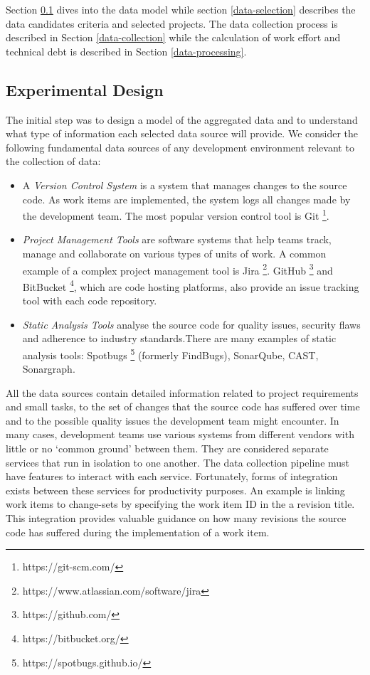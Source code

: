 \documentclass{mpaper}
\begin{document}
Section \ref{experimental-design} dives into the data model while section
\ref{data-selection} describes the data candidates criteria and selected
projects. The data collection process is described in Section
\ref{data-collection} while the calculation of work effort and technical debt is
described in Section \ref{data-processing}.

\subsection{Experimental Design}
\label{experimental-design}

The initial step was to design a model of the aggregated data and to understand
what type of information each selected data source will provide. We consider the
following fundamental data sources of any development environment relevant to
the collection of data:

\begin{itemize}
  \item A \emph{Version Control System} is a system that manages changes to the
  source code. As work items are implemented, the system logs all changes made
  by the development team. The most popular version control tool is Git
  \footnote{https://git-scm.com/}.

  \item \emph{Project Management Tools} are software systems that help teams
  track, manage and collaborate on various types of units of work. A common
  example of a complex project management tool is Jira
  \footnote{https://www.atlassian.com/software/jira}. GitHub
  \footnote{https://github.com/} and BitBucket
  \footnote{https://bitbucket.org/}, which are code hosting platforms, also
  provide an issue tracking tool with each code repository.
  
  \item \emph{Static Analysis Tools} analyse the source code for quality issues,
  security flaws and adherence to industry standards.There are many examples of
  static analysis tools: Spotbugs \footnote{https://spotbugs.github.io/}
  (formerly FindBugs), SonarQube, CAST, Sonargraph.

\end{itemize}

All the data sources contain detailed information related to project
requirements and small tasks, to the set of changes that the source code has
suffered over time and to the possible quality issues the development team might
encounter. In many cases, development teams use various systems from different
vendors with little or no `common ground' between them. They are considered
separate services that run in isolation to one another. The data collection
pipeline must have features to interact with each service. Fortunately, forms of
integration exists between these services for productivity purposes. An example
is linking work items to change-sets by specifying the work item ID in the a
revision title. This integration provides valuable guidance on how many
revisions the source code has suffered during the implementation of a work item.
\end{document}

